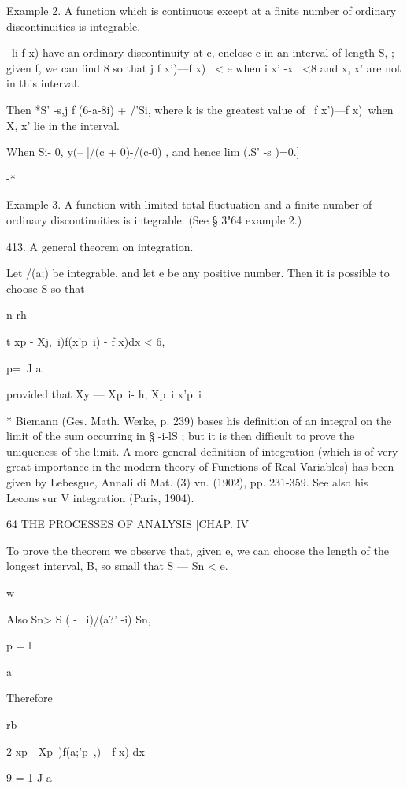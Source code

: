 Example 2. A function which is continuous except at a finite number of ordinary 
discontinuities is integrable. 

\ li f x) have an ordinary discontinuity at c, enclose c in an interval of length S, ; 
given f, we can find 8 so that j f x')—f x) \ < e when i x' -x \ <8 and x, x' are not in this 
interval. 

Then *S'  -s,j f (6-a-8i) + /'Si, where k is the greatest value of \ f x')—f x)\, when 
X, x' lie in the interval. 

When Si- 0, y(-- |/(c + 0)-/(c-0) , and hence lim (.S' -s )=0.] 

 -*   

Example 3. A function with limited total fluctuation and a finite number of ordinary 
discontinuities is integrable. (See § 3"64 example 2.) 

413. A general theorem on integration. 

Let /(a;) be integrable, and let e be any positive number. Then it is 
possible to choose S so that 

n rh 

t  xp - Xj,\ i)f(x'p\ i) - f x)dx < 6, 

p=\ J a 

provided that Xy — Xp\ i- h, Xp\ i x'p\ i%

* Biemann (Ges. Math. Werke, p. 239) bases his definition of an integral on the limit of the 
sum occurring in § -i-lS ; but it is then difficult to prove the uniqueness of the limit. A more 
general definition of integration (which is of very great importance in the modern theory of 
Functions of Real Variables) has been given by Lebesgue, Annali di Mat. (3) vn. (1902), 
pp. 231-359. See also his Lecons sur V integration (Paris, 1904). 



64 THE PROCESSES OF ANALYSIS [CHAP. IV 

To prove the theorem we observe that, given e, we can choose the length 
of the longest interval, B, so small that S  — Sn < e. 

w 

Also Sn> S (  -  \ i)/(a?' -i)   Sn, 

p = l 

  a 

Therefore 



  rb 

2  xp - Xp\  )f(a;'p\ ,) - f x) dx 

9 = 1 J a 



